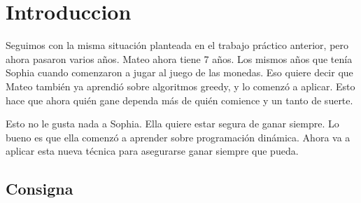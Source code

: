 \section{Introduccion}

Seguimos con la misma situación planteada en el trabajo práctico anterior, pero ahora pasaron varios años. Mateo ahora tiene 7 años. Los mismos años que tenía Sophia cuando comenzaron a jugar al juego de las monedas. Eso quiere decir que Mateo también ya aprendió sobre algoritmos greedy, y lo comenzó a aplicar. Esto hace que ahora quién gane dependa más de quién comience y un tanto de suerte.

Esto no le gusta nada a Sophia. Ella quiere estar segura de ganar siempre. Lo bueno es que ella comenzó a aprender sobre programación dinámica. Ahora va a aplicar esta nueva técnica para asegurarse ganar siempre que pueda.

\subsection{Consigna}

